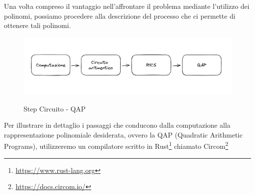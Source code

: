 Una volta compreso il vantaggio nell'affrontare il problema mediante l'utilizzo dei polinomi, possiamo
procedere alla descrizione del processo che ci permette di ottenere tali polinomi.

\begin{figure}[H]
    \centering
    \includegraphics[width=14cm]{./chapters/1.state-of-art/images/8.comp_qap.png}
    \label{fig:comp-qap}
    \captionsetup{justification=centering}
    \caption{Step Circuito - QAP}
\end{figure}

Per illustrare in dettaglio i passaggi che conducono dalla computazione alla rappresentazione polinomiale desiderata,
ovvero la QAP (Quadratic Arithmetic Programs), utilizzeremo un compilatore scritto in Rust\footnote{\url{https://www.rust-lang.org}} chiamato Circom\footnote{\url{https://docs.circom.io/}}

